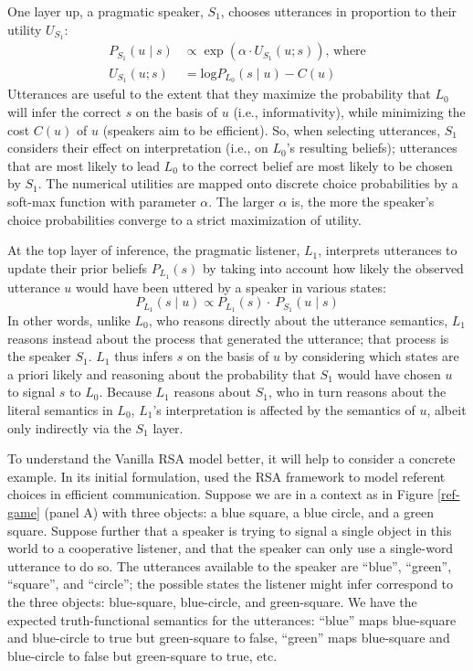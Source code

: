\documentclass{sp}
\begin{document}
One layer up, a pragmatic speaker, $S_1$, chooses utterances in proportion to their utility $U_{S_{1}}$:
\begin{align} \label{S1}
  P_{S_1}(u \mid s) & \propto \exp (\alpha \cdot U_{S_1}(u;s))\text{, where} \\
  U_{S_1}(u; s) & = \textrm{log}P_{L_0}(s \mid u) - C(u) \nonumber
\end{align}
Utterances are useful to the extent that they maximize the probability that $L_0$ will infer the correct $s$ on the basis of $u$ (i.e., informativity), while minimizing the cost $C(u)$ of $u$ (speakers aim to be efficient). So, when selecting utterances, $S_1$ considers their effect on interpretation (i.e., on $L_0$'s resulting beliefs); utterances that are most likely to lead $L_0$ to the correct belief are most likely to be chosen by $S_1$.
The numerical utilities are mapped onto discrete choice probabilities by a soft-max function with parameter $\alpha$.
The larger $\alpha$ is, the more the speaker's choice probabilities converge to a strict maximization of utility.

At the top layer of inference, the pragmatic listener, $L_1$, interprets utterances to update their prior beliefs $P_{{L_1}}(s)$ by taking into account how likely the observed utterance $u$ would have been uttered by a speaker in various states:
\begin{equation} \label{L1}
P_{L_1}(s \mid u) \propto P_{L_1}(s) \cdot \ P_{S_1}(u \mid s)
\end{equation}
In other words, unlike $L_0$, who reasons directly about the utterance semantics, $L_1$ reasons instead about the process that generated the utterance; that process is the speaker $S_1$. $L_1$ thus infers $s$ on the basis of $u$ by considering which states are a priori likely and reasoning about the probability that $S_1$ would have chosen $u$ to signal $s$ to $L_0$. Because $L_1$ reasons about $S_1$, who in turn reasons about the literal semantics in $L_0$, $L_1$'s interpretation is affected by the semantics of $u$, albeit only indirectly via the $S_1$ layer.

To understand the Vanilla RSA model better, it will help to consider a concrete example.
In its initial formulation, \cite{frankgoodman2012} used the RSA framework to model referent choices in efficient communication. Suppose we are in a context as in Figure \ref{ref-game} (panel A) with three objects: a blue square, a blue circle, and a green square. Suppose further that a speaker is trying to signal a single object in this world to a cooperative listener, and that the speaker can only use a single-word utterance to do so. The utterances available to the speaker are ``blue'', ``green'', ``square'', and ``circle''; the possible states the listener might infer correspond to the three objects: blue-square, blue-circle, and green-square. We have the expected truth-functional semantics for the utterances: ``blue'' maps blue-square and blue-circle to true but green-square to false, ``green'' maps blue-square and blue-circle to false but green-square to true, etc.
\end{document}
